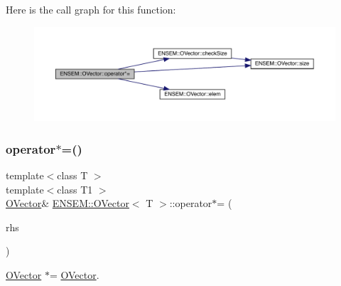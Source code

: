 Here is the call graph for this function\+:
\nopagebreak
\begin{figure}[H]
\begin{center}
\leavevmode
\includegraphics[width=350pt]{d0/d8d/classENSEM_1_1OVector_ab1d7773b4a23e20961ece98c90b915b4_cgraph}
\end{center}
\end{figure}
\mbox{\label{classENSEM_1_1OVector_ab1d7773b4a23e20961ece98c90b915b4}} 
\subsubsection{\texorpdfstring{operator$\ast$=()}{operator*=()}\hspace{0.1cm}{\footnotesize\ttfamily [5/6]}}
{\footnotesize\ttfamily template$<$class T $>$ \\
template$<$class T1 $>$ \\
\mbox{\hyperlink{classENSEM_1_1OVector}{O\+Vector}}\& \mbox{\hyperlink{classENSEM_1_1OVector}{E\+N\+S\+E\+M\+::\+O\+Vector}}$<$ T $>$\+::operator$\ast$= (\begin{DoxyParamCaption}\item[{const \mbox{\hyperlink{classENSEM_1_1OVector}{O\+Vector}}$<$ T1 $>$ \&}]{rhs }\end{DoxyParamCaption})\hspace{0.3cm}{\ttfamily [inline]}}



\mbox{\hyperlink{classENSEM_1_1OVector}{O\+Vector}} $\ast$= \mbox{\hyperlink{classENSEM_1_1OVector}{O\+Vector}}. 

